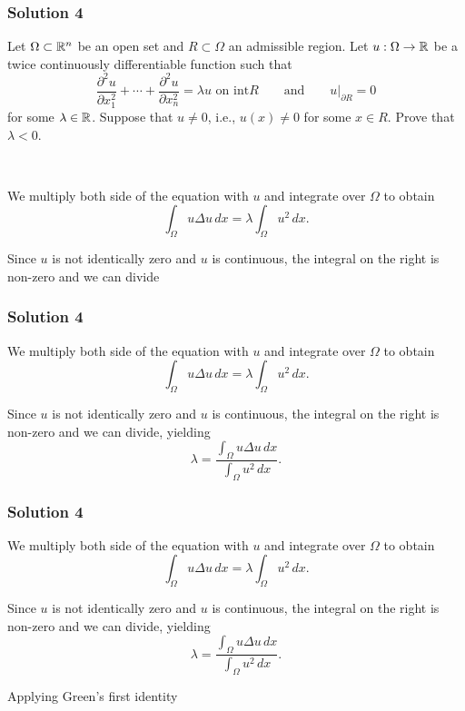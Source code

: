 \documentclass[10pt, t, allowdisplaybreaks]{beamer}
\newcommand{\nullspacesmall}{~\vspace{1em}}
\newcommand{\at}[3]{\left.#1\right\vert_{#2}^{#3}}
\begin{document}
\begin{frame}
    \frametitle{Solution 4}
    \par Let $\Omega\subset \mathbb{R}^n$ be an open set and $R\subset \Omega$ an admissible region. Let $u:\Omega\rightarrow\mathbb{R}$ be a twice continuously differentiable 
    function such that 
    \begin{equation*}
        \frac{\partial^2 u}{\partial x^2_1} + \cdots + \frac{\partial^2 u}{\partial x^2_n} = \lambda u\text{ on int}R\qquad \text{and}\qquad \at{u}{\partial R}{} = 0
    \end{equation*}
    for some $\lambda\in\mathbb{R}$. Suppose that $u\neq 0$, i.e., $u(x)\neq 0$ for some $x\in R$. Prove that $\lambda<0$.

    \nullspacesmall

    \par We multiply both side of the equation with $u$ and integrate over $\Omega$ to obtain 
    \begin{equation*}
        \int_\Omega u\Delta u\,dx = \lambda\int_\Omega u^2\,dx.
    \end{equation*}
    \par Since $u$ is not identically zero and $u$ is continuous, the integral on the right is non-zero and we can divide
\end{frame}
\begin{frame}
    \frametitle{Solution 4}
    \par We multiply both side of the equation with $u$ and integrate over $\Omega$ to obtain 
    \begin{equation*}
        \int_\Omega u\Delta u\,dx = \lambda\int_\Omega u^2\,dx.
    \end{equation*}
        
    \par Since $u$ is not identically zero and $u$ is continuous, the integral on the right is non-zero and we can divide, yielding
    \begin{equation*}
        \lambda = \frac{\int_\Omega u\Delta u\,dx}{\int_\Omega u^2\,dx}.
    \end{equation*}
\end{frame}
\begin{frame}
    \frametitle{Solution 4}
    \par We multiply both side of the equation with $u$ and integrate over $\Omega$ to obtain 
    \begin{equation*}
        \int_\Omega u\Delta u\,dx = \lambda\int_\Omega u^2\,dx.
    \end{equation*}
        
    \par Since $u$ is not identically zero and $u$ is continuous, the integral on the right is non-zero and we can divide, yielding
    \begin{equation*}
        \lambda = \frac{\int_\Omega u\Delta u\,dx}{\int_\Omega u^2\,dx}.
    \end{equation*}

    \par Applying Green's first identity
\end{frame}
\end{document}
